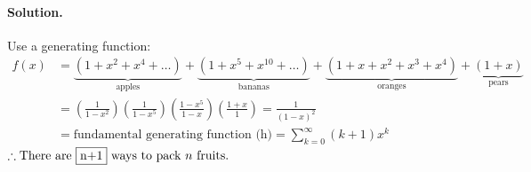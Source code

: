 \paragraph{Solution.} Use a generating function:
\begin{align*}
    f(x)    &=  
    \underbrace{(1 + x^2 + x^4 + \dots)}_\text{apples} + 
    \underbrace{(1 + x^5 + x^{10} + \dots)}_\text{bananas} + 
    \underbrace{(1 + x + x^2 + x^3 + x^4)}_\text{oranges} + 
    \underbrace{(1 + x)}_\text{pears}\\
            &= \left(\frac{1}{1-x^2}\right) \left(\frac{1}{1-x^5}\right)
            \left(\frac{1-x^5}{1-x}\right)
            \left(\frac{1+x}{1}\right) = \frac{1}{(1-x)^2} \\
            &= \text{fundamental generating function (h)}
            =  \sum_{k=0}^{\infty} (k+1)x^k
\end{align*}
$\therefore \text{There are \boxed{$n+1$} ways to pack $n$ fruits.}$

% 

